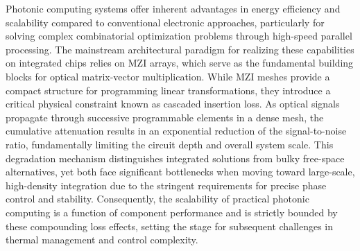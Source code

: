 Photonic computing systems offer inherent advantages in energy efficiency and scalability compared to conventional electronic approaches, particularly for solving complex combinatorial optimization problems through high-speed parallel processing. The mainstream architectural paradigm for realizing these capabilities on integrated chips relies on MZI arrays, which serve as the fundamental building blocks for optical matrix-vector multiplication. \citep{doi_10_1088_1402_4896_ae8345_3b948559} While MZI meshes provide a compact structure for programming linear transformations, they introduce a critical physical constraint known as cascaded insertion loss. As optical signals propagate through successive programmable elements in a dense mesh, the cumulative attenuation results in an exponential reduction of the signal-to-noise ratio, fundamentally limiting the circuit depth and overall system scale. This degradation mechanism distinguishes integrated solutions from bulky free-space alternatives, yet both face significant bottlenecks when moving toward large-scale, high-density integration due to the stringent requirements for precise phase control and stability. Consequently, the scalability of practical photonic computing is a function of component performance and is strictly bounded by these compounding loss effects, setting the stage for subsequent challenges in thermal management and control complexity. \citep{doi_10_1088_1402_4896_ae8345_3b948559} \citep{doi_10_3390_nano14080697_c372a140}

